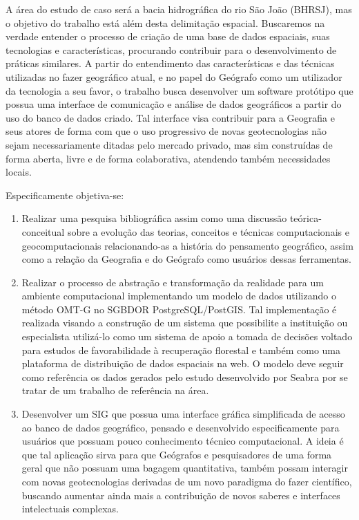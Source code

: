 A área do estudo de caso será a bacia hidrográfica do rio São João (BHRSJ), mas o objetivo do trabalho está além desta delimitação espacial. Buscaremos na verdade entender o processo de criação de uma base de dados espaciais, suas tecnologias e características, procurando contribuir para o desenvolvimento de práticas similares. A partir do entendimento das características e das técnicas utilizadas no fazer geográfico atual, e no papel do Geógrafo como um utilizador da tecnologia a seu favor, o trabalho busca desenvolver um software protótipo que possua uma interface de comunicação e análise de dados geográficos a partir do uso do banco de dados criado. Tal interface visa contribuir para a Geografia e seus atores de forma com que o uso progressivo de novas geotecnologias não sejam necessariamente ditadas pelo mercado privado, mas sim construídas de forma aberta, livre e de forma colaborativa, atendendo também necessidades locais. \par
Especificamente objetiva-se: \par
\begin{enumerate}
	\item Realizar uma pesquisa bibliográfica assim como uma discussão teórica-conceitual sobre a evolução das teorias, conceitos e técnicas computacionais e geocomputacionais relacionando-as a história do pensamento geográfico, assim como a relação da Geografia e do Geógrafo como usuários dessas ferramentas.
	\item Realizar o processo de abstração e transformação da realidade para um ambiente computacional implementando um modelo de dados utilizando o método OMT-G no SGBDOR PostgreSQL/PostGIS. Tal implementação é realizada visando a construção de um sistema que  possibilite a instituição ou especialista utilizá-lo como um sistema de apoio a tomada de decisões voltado para estudos de favorabilidade à recuperação florestal e também como uma plataforma de distribuição de dados espaciais na web. O modelo deve seguir como referência os dados gerados pelo estudo desenvolvido por Seabra\cite{SEABRA} por se tratar de um trabalho de referência na área.
	\item Desenvolver um SIG que possua uma interface gráfica simplificada de acesso ao banco de dados geográfico, pensado e desenvolvido especificamente para usuários que possuam pouco conhecimento técnico computacional. A ideia é que tal aplicação sirva para que Geógrafos e pesquisadores de uma forma geral que não possuam uma bagagem quantitativa, também possam interagir com novas geotecnologias derivadas de um novo paradigma do fazer científico, buscando aumentar ainda mais a contribuição de novos saberes e interfaces intelectuais complexas.
\end{enumerate}